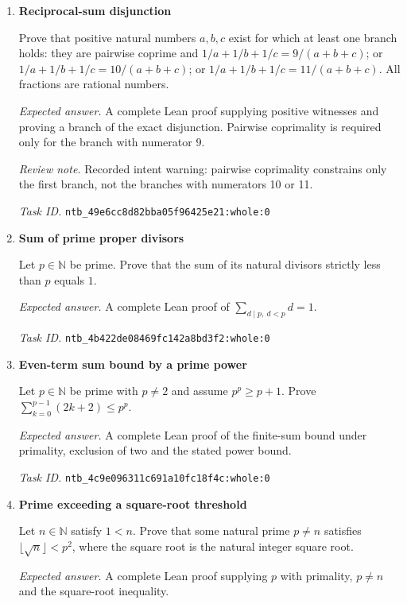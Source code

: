 \documentclass[11pt]{article}
\newcommand{\pth}[1]{\nolinkurl{#1}}
\begin{document}
\begin{enumerate}[label={TEST \arabic*.},leftmargin=4.5em,itemsep=1em]
\emph{Task ID.} \pth{ntb_4613017e2c6d8b3546380196:whole:0}

\item \textbf{Reciprocal-sum disjunction}\label{qn:test:27}

Prove that positive natural numbers $a,b,c$ exist for which at least one branch holds: they are pairwise coprime and $1/a+1/b+1/c=9/(a+b+c)$; or $1/a+1/b+1/c=10/(a+b+c)$; or $1/a+1/b+1/c=11/(a+b+c)$. All fractions are rational numbers.

\emph{Expected answer.} A complete Lean proof supplying positive witnesses and proving a branch of the exact disjunction. Pairwise coprimality is required only for the branch with numerator $9$.

\emph{Review note.} Recorded intent warning: pairwise coprimality constrains only the first branch, not the branches with numerators 10 or 11.

\emph{Task ID.} \pth{ntb_49e6cc8d82bba05f96425e21:whole:0}

\item \textbf{Sum of prime proper divisors}\label{qn:test:28}

Let $p\in\mathbb{N}$ be prime. Prove that the sum of its natural divisors strictly less than $p$ equals $1$.

\emph{Expected answer.} A complete Lean proof of $\sum_{d\mid p,\ d<p}d=1$.

\emph{Task ID.} \pth{ntb_4b422de08469fc142a8bd3f2:whole:0}

\item \textbf{Even-term sum bound by a prime power}\label{qn:test:29}

Let $p\in\mathbb{N}$ be prime with $p\ne2$ and assume $p^p\ge p+1$. Prove $\sum_{k=0}^{p-1}(2k+2)\le p^p$.

\emph{Expected answer.} A complete Lean proof of the finite-sum bound under primality, exclusion of two and the stated power bound.

\emph{Task ID.} \pth{ntb_4c9e096311c691a10fc18f4c:whole:0}

\item \textbf{Prime exceeding a square-root threshold}\label{qn:test:30}

Let $n\in\mathbb{N}$ satisfy $1<n$. Prove that some natural prime $p\ne n$ satisfies $\lfloor\sqrt n\rfloor<p^2$, where the square root is the natural integer square root.

\emph{Expected answer.} A complete Lean proof supplying $p$ with primality, $p\ne n$ and the square-root inequality.


\end{enumerate}
\end{document}
